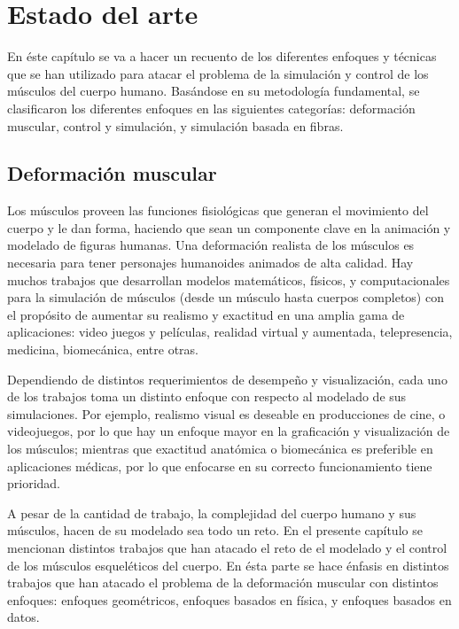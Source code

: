\chapter{Estado del arte} %

\label{EstadoDelArte} %


En éste capítulo se va a hacer un recuento de los diferentes enfoques y técnicas que se han utilizado para atacar el problema de la simulación y control de los músculos del cuerpo humano. Basándose en su metodología fundamental, se clasificaron los diferentes enfoques en las siguientes categorías: deformación muscular, control y simulación, y simulación basada en fibras.

\section{Deformación muscular}

Los músculos proveen las funciones fisiológicas que generan el movimiento del cuerpo y le dan forma, haciendo que sean un componente clave en la animación y modelado de figuras humanas. Una deformación realista de los músculos es necesaria para tener personajes humanoides animados de alta calidad. Hay muchos trabajos que desarrollan modelos matemáticos, físicos, y computacionales para la simulación de músculos (desde un músculo hasta cuerpos completos) con el propósito de aumentar su realismo y exactitud en una amplia gama de aplicaciones: video juegos y películas, realidad virtual y aumentada, telepresencia, medicina, biomecánica, entre otras. 

Dependiendo de distintos requerimientos de desempeño y visualización, cada uno de los trabajos toma un distinto enfoque con respecto al modelado de sus simulaciones. Por ejemplo, realismo visual es deseable en producciones de cine, o videojuegos, por lo que hay un enfoque mayor en la graficación y visualización de los músculos; mientras que exactitud anatómica o biomecánica es preferible en aplicaciones médicas, por lo que enfocarse en su correcto funcionamiento tiene prioridad. 

A pesar de la cantidad de trabajo, la complejidad del cuerpo humano y sus músculos, hacen de su modelado sea todo un reto. En el presente capítulo se mencionan distintos trabajos que han atacado el reto de el modelado y el control de los músculos esqueléticos del cuerpo. En ésta parte se hace énfasis en distintos trabajos que han atacado el problema de la deformación muscular con distintos enfoques: enfoques geométricos, enfoques basados en física, y enfoques basados en datos.

